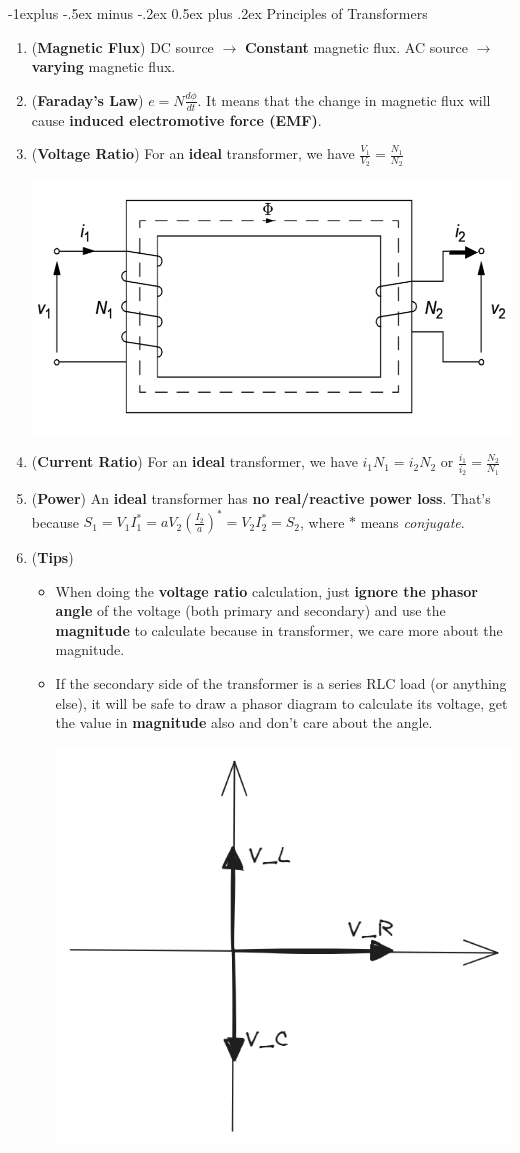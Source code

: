 \documentclass[10pt, landscape]{article}
\makeatletter
\renewcommand{\subsection}{\@startsection{subsection}{2}{0mm}%
                                {-1explus -.5ex minus -.2ex}%
                                {0.5ex plus .2ex}%
                                {\normalfont\normalsize\bfseries}}
\makeatother
\begin{document}
\begin{multicols}{4}
\subsection{Principles of Transformers}
\begin{enumerate}
    \item (\textbf{Magnetic Flux}) DC source $\rightarrow$ \textbf{Constant} magnetic flux. AC source $\rightarrow$ \textbf{varying} magnetic flux.
    \item (\textbf{Faraday's Law}) $e=N\frac{d\phi}{dt}$. It means that the change in magnetic flux will cause \textbf{induced electromotive force (EMF)}.
    \item (\textbf{Voltage Ratio}) For an \textbf{ideal} transformer, we have $\frac{V_1}{V_2}=\frac{N_1}{N_2}$\\
    \centerline{\includegraphics[width=0.5\linewidth]{images/voltage-ratio.png}}
    \item (\textbf{Current Ratio}) For an \textbf{ideal} transformer, we have $i_1N_1=i_2N_2$ or $\frac{i_1}{i_2}=\frac{N_2}{N_1}$
    \item (\textbf{Power}) An \textbf{ideal} transformer has \textbf{no real/reactive power loss}. That's because $S_1=V_1I_1^*=aV_2(\frac{I_2}{a})^*=V_2I_2^*=S_2$, where $*$ means \textit{conjugate}. 
    \item (\textbf{Tips})
    \begin{itemize}
        \item When doing the \textbf{voltage ratio} calculation, just \textbf{ignore the phasor angle} of the voltage (both primary and secondary) and use the \textbf{magnitude} to calculate because in transformer, we care more about the magnitude.
        \item If the secondary side of the transformer is a series RLC load (or anything else), it will be safe to draw a phasor diagram to calculate its voltage, get the value in \textbf{magnitude} also and don't care about the angle. \\
        \centerline{\includegraphics[width=0.5\linewidth]{images/series-rlc.png}}

\end{itemize}
\end{enumerate}
\end{multicols}
\end{document}
